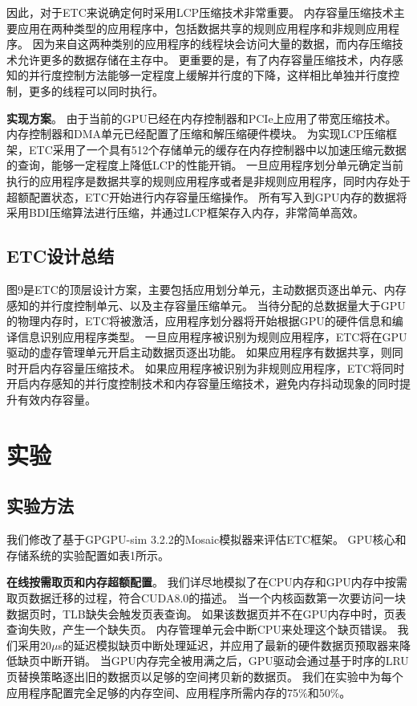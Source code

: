 因此，对于ETC来说确定何时采用LCP压缩技术非常重要。
内存容量压缩技术主要应用在两种类型的应用程序中，包括数据共享的规则应用程序和非规则应用程序。
因为来自这两种类别的应用程序的线程块会访问大量的数据，而内存压缩技术允许更多的数据存储在主存中。
更重要的是，有了内存容量压缩技术，内存感知的并行度控制方法能够一定程度上缓解并行度的下降，这样相比单独并行度控制，更多的线程可以同时执行。

\textbf{实现方案}。
由于当前的GPU已经在内存控制器和PCIe上应用了带宽压缩技术。
内存控制器和DMA单元已经配置了压缩和解压缩硬件模块。
为实现LCP压缩框架，ETC采用了一个具有512个存储单元的缓存在内存控制器中以加速压缩元数据的查询，能够一定程度上降低LCP的性能开销。
一旦应用程序划分单元确定当前执行的应用程序是数据共享的规则应用程序或者是非规则应用程序，同时内存处于超额配置状态，ETC开始进行内存容量压缩操作。
所有写入到GPU内存的数据将采用BDI压缩算法进行压缩，并通过LCP框架存入内存，非常简单高效。

\subsection{ETC设计总结}
图9是ETC的顶层设计方案，主要包括应用划分单元，主动数据页逐出单元、内存感知的并行度控制单元、以及主存容量压缩单元。
当待分配的总数据量大于GPU的物理内存时，ETC将被激活，应用程序划分器将开始根据GPU的硬件信息和编译信息识别应用程序类型。
一旦应用程序被识别为规则应用程序，ETC将在GPU驱动的虚存管理单元开启主动数据页逐出功能。
如果应用程序有数据共享，则同时开启内存容量压缩技术。
如果应用程序被识别为非规则应用程序，ETC将同时开启内存感知的并行度控制技术和内存容量压缩技术，避免内存抖动现象的同时提升有效内存容量。



\section{实验}

\subsection{实验方法}

我们修改了基于GPGPU-sim 3.2.2的Mosaic模拟器来评估ETC框架。
GPU核心和存储系统的实验配置如表1所示。

\textbf{在线按需取页和内存超额配置}。
我们详尽地模拟了在CPU内存和GPU内存中按需取页数据迁移的过程，符合CUDA8.0的描述。
当一个内核函数第一次要访问一块数据页时，TLB缺失会触发页表查询。
如果该数据页并不在GPU内存中时，页表查询失败，产生一个缺失页。
内存管理单元会中断CPU来处理这个缺页错误。
我们采用20$\mu$s的延迟模拟缺页中断处理延迟，并应用了最新的硬件数据页预取器来降低缺页中断开销。
当GPU内存完全被用满之后，GPU驱动会通过基于时序的LRU页替换策略逐出旧的数据页以足够的空间拷贝新的数据页。
我们在实验中为每个应用程序配置完全足够的内存空间、应用程序所需内存的75\%和50\%。

